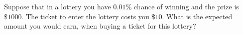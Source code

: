 
Suppose that in a lottery you have $0.01\%$ chance of winning and the prize is $\$1000$. The ticket to enter the lottery costs you $\$10$. What is the expected amount you would earn, when buying a ticket for this lottery? 

\smallspace

